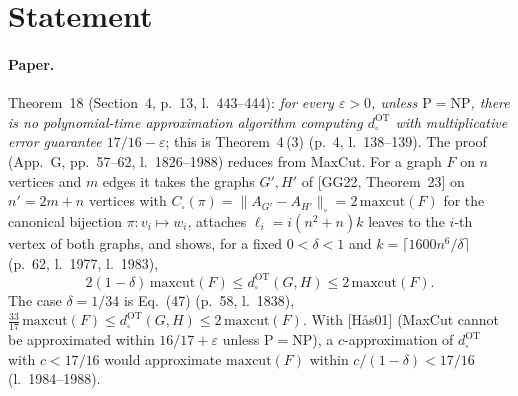 

\paperversion

\section{Statement}

\paragraph{Paper.} Theorem~18 (Section~4, p.~13, l.~443--444): \emph{for every $\varepsilon>0$, unless
$\mathrm{P}=\mathrm{NP}$, there is no polynomial-time approximation algorithm computing $d^{\mathrm{OT}}_\square$
with multiplicative error guarantee $17/16-\varepsilon$}; this is Theorem~4\,(3) (p.~4, l.~138--139). The proof
(App.~G, pp.~57--62, l.~1826--1988) reduces from MaxCut. For a graph $F$ on $n$ vertices and $m$ edges it takes the
graphs $G',H'$ of [GG22, Theorem~23] on $n'=2m+n$ vertices with $C_\square(\pi)=\|A_{G'}-A_{H'}\|_\square=
2\,\mathrm{maxcut}(F)$ for the canonical bijection $\pi\colon v_i\mapsto w_i$, attaches $\ell_i=i(n^2+n)k$
leaves to the $i$-th vertex of both graphs, and shows, for a fixed $0<\delta<1$ and $k=\lceil1600n^6/\delta\rceil$
(p.~62, l.~1977, l.~1983),
\[ 2(1-\delta)\,\mathrm{maxcut}(F)\le d^{\mathrm{OT}}_\square(G,H)\le2\,\mathrm{maxcut}(F). \]
The case $\delta=1/34$ is Eq.~(47) (p.~58, l.~1838), $\tfrac{33}{17}\,\mathrm{maxcut}(F)\le
d^{\mathrm{OT}}_\square(G,H)\le2\,\mathrm{maxcut}(F)$. With [H\aa s01] (MaxCut cannot be approximated within
$16/17+\varepsilon$ unless $\mathrm{P}=\mathrm{NP}$), a $c$-approximation of $d^{\mathrm{OT}}_\square$ with
$c<17/16$ would approximate $\mathrm{maxcut}(F)$ within $c/(1-\delta)<17/16$ (l.~1984--1988).

